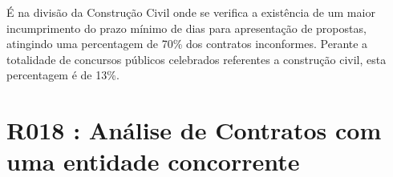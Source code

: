É na divisão da Construção Civil onde se verifica a existência de um maior incumprimento do prazo mínimo de dias para apresentação de propostas, atingindo uma percentagem de 70\% dos contratos inconformes. Perante a totalidade de concursos públicos celebrados referentes a construção civil, esta percentagem é de 13\%.


%
%
%
%
%
%	
%	
%
%

\section{R018 : Análise de Contratos com uma entidade concorrente}
\label{ch:entis}

